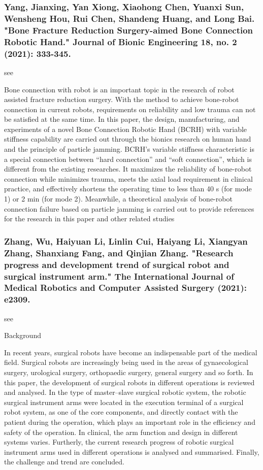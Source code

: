 \documentclass[conference]{IEEEtran}
\begin{document}
\medskip
\subsubsection{Yang, Jianxing, Yan Xiong, Xiaohong Chen, Yuanxi Sun, Wensheng Hou, Rui Chen, Shandeng Huang, and Long Bai. "Bone Fracture Reduction Surgery-aimed Bone Connection Robotic Hand." Journal of Bionic Engineering 18, no. 2 (2021): 333-345.}
see \cite{yang2021bone}

Bone connection with robot is an important topic in the research of robot assisted fracture reduction surgery. With the method to achieve bone-robot connection in current robots, requirements on reliability and low trauma can not be satisfied at the same time. In this paper, the design, manufacturing, and experiments of a novel Bone Connection Robotic Hand (BCRH) with variable stiffness capability are carried out through the bionics research on human hand and the principle of particle jamming. BCRH’s variable stiffness characteristic is a special connection between “hard connection” and “soft connection”, which is different from the existing researches. It maximizes the reliability of bone-robot connection while minimizes trauma, meets the axial load requirement in clinical practice, and effectively shortens the operating time to less than 40 s (for mode 1) or 2 min (for mode 2). Meanwhile, a theoretical analysis of bone-robot connection failure based on particle jamming is carried out to provide references for the research in this paper and other related studies

\medskip
\subsubsection{Zhang, Wu, Haiyuan Li, Linlin Cui, Haiyang Li, Xiangyan Zhang, Shanxiang Fang, and Qinjian Zhang. "Research progress and development trend of surgical robot and surgical instrument arm." The International Journal of Medical Robotics and Computer Assisted Surgery (2021): e2309.}
see \cite{zhang2021research}

Background

In recent years, surgical robots have become an indispensable part of the medical field. Surgical robots are increasingly being used in the areas of gynaecological surgery, urological surgery, orthopaedic surgery, general surgery and so forth. In this paper, the development of surgical robots in different operations is reviewed and analysed. In the type of master–slave surgical robotic system, the robotic surgical instrument arms were located in the execution terminal of a surgical robot system, as one of the core components, and directly contact with the patient during the operation, which plays an important role in the efficiency and safety of the operation. In clinical, the arm function and design in different systems varies. Furtherly, the current research progress of robotic surgical instrument arms used in different operations is analysed and summarised. Finally, the challenge and trend are concluded.
\end{document}
